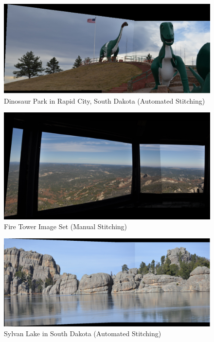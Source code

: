 \documentclass[12pt,journal,compsoc]{IEEEtran}
\begin{document}
\begin{figure}[h]
	\centering
		  \centering
		  \includegraphics[width=1\linewidth]{img/dino1}
		  \caption{Dinosaur Park in Rapid City, South Dakota (Automated Stitching)}
		  \label{fig:dino1}
\end{figure}

\begin{figure}[h]
	\centering
		  \centering
		  \includegraphics[width=1\linewidth]{img/tower1}
		  \caption{Fire Tower Image Set (Manual Stitching)}
		  \label{fig:tower1}
\end{figure}

\begin{figure}[h]
	\centering
		  \centering
		  \includegraphics[width=1\linewidth]{img/sylvan1}
		  \caption{Sylvan Lake in South Dakota (Automated Stitching)}
		  \label{fig:sylvan1}
\end{figure}
\end{document}
